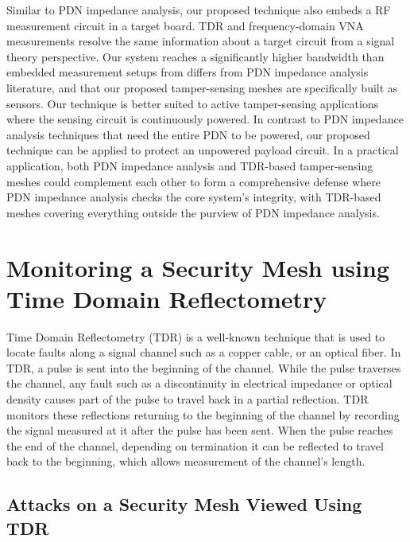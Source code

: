 \documentclass[final]{iacrtrans}
\begin{document}
Similar to PDN impedance analysis, our proposed technique also embeds a RF measurement circuit in a target board. TDR
and frequency-domain VNA measurements resolve the same information about a target circuit from a signal theory
perspective. Our system reaches a significantly higher bandwidth than embedded measurement setups from differs from PDN
impedance analysis literature, and that our proposed tamper-sensing meshes are specifically built as sensors. Our
technique is better suited to active tamper-sensing applications where the sensing circuit is continuously powered. In
contrast to PDN impedance analysis techniques that need the entire PDN to be powered, our proposed technique can be
applied to protect an unpowered payload circuit. In a practical application, both PDN impedance analysis and TDR-based
tamper-sensing meshes could complement each other to form a comprehensive defense where PDN impedance analysis checks
the core system's integrity, with TDR-based meshes covering everything outside the purview of PDN impedance analysis.

\section{Monitoring a Security Mesh using Time Domain Reflectometry}

Time Domain Reflectometry (TDR) is a well-known technique that is used to locate faults along a signal channel such as a
copper cable, or an optical fiber. In TDR, a pulse is sent into the beginning of the channel. While the pulse traverses
the channel, any fault such as a discontinuity in electrical impedance or optical density causes part of the pulse to
travel back in a partial reflection. TDR monitors these reflections returning to the beginning of the channel by
recording the signal measured at it after the pulse has been sent. When the pulse reaches the end of the channel,
depending on termination it can be reflected to travel back to the beginning, which allows measurement of the channel's
length. 

\subsection{Attacks on a Security Mesh Viewed Using TDR}
\end{document}

